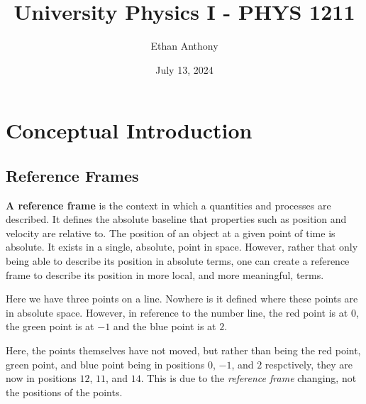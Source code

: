 \documentclass{article}
\title{University Physics I - PHYS 1211}
\date{July 13, 2024}
\author{Ethan Anthony}
\begin{document}
\maketitle
\tableofcontents
\newpage

\section{Conceptual Introduction}
\subsection{Reference Frames}
\textbf{A reference frame} is the context in which a quantities and processes are described.
It defines the absolute baseline that properties such as position and velocity are relative to.
The position of an object at a given point of time is absolute. It exists in a single,
absolute, point in space. However, rather that only being able to describe its position in
absolute terms, one can create a reference frame to describe its position in more local, and
more meaningful, terms.

\begin{center}
\end{center}

Here we have three points on a line. Nowhere is it defined where these points are in
absolute space. However, in reference to the number line, the red point is at $0$, 
the green point is at $-1$ and the blue point is at $2$.

\begin{center}
\end{center}

Here, the points themselves have not moved, but rather than being the red point, green point, 
and blue point being in positions $0$, $-1$, and $2$ respctively, they are now
in positions $12$, $11$, and $14$. This is due to the \textit{reference frame} changing, 
not the positions of the points.
\end{document}
